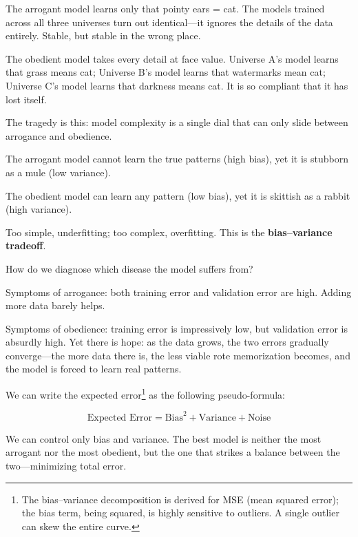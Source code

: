 \vspace{1em}

The arrogant model learns only that pointy ears = cat. The models trained across all three universes turn out identical---it ignores the details of the data entirely. Stable, but stable in the wrong place.

The obedient model takes every detail at face value. Universe A's model learns that grass means cat; Universe B's model learns that watermarks mean cat; Universe C's model learns that darkness means cat. It is so compliant that it has lost itself.

\vspace{1em}

The tragedy is this: model complexity is a single dial that can only slide between arrogance and obedience.

The arrogant model cannot learn the true patterns (high bias), yet it is stubborn as a mule (low variance).

The obedient model can learn any pattern (low bias), yet it is skittish as a rabbit (high variance).

Too simple, underfitting; too complex, overfitting. This is the \textbf{bias--variance tradeoff}.

\vspace{1em}

How do we diagnose which disease the model suffers from?

Symptoms of arrogance: both training error and validation error are high. Adding more data barely helps.

Symptoms of obedience: training error is impressively low, but validation error is absurdly high. Yet there is hope: as the data grows, the two errors gradually converge---the more data there is, the less viable rote memorization becomes, and the model is forced to learn real patterns.

\vspace{1em}

We can write the expected error\footnote{The bias--variance decomposition is derived for MSE (mean squared error); the bias term, being squared, is highly sensitive to outliers. A single outlier can skew the entire curve.} as the following pseudo-formula:

\begin{equation*}
\text{Expected Error} = \text{Bias}^2 + \text{Variance} + \text{Noise}
\end{equation*}

We can control only bias and variance.
The best model is neither the most arrogant nor the most obedient, but the one that strikes a balance between the two---minimizing total error.

